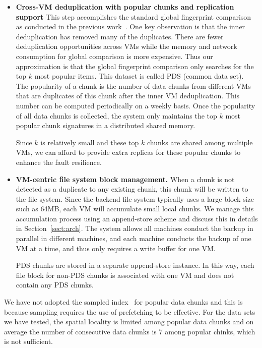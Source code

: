 \begin{itemize}
\item \textbf{Cross-VM deduplication with popular chunks and replication support}
This step accomplishes the standard global fingerprint  comparison as conducted
in the previous work~\cite{??}.
One key observation is that the inner deduplication has removed many of the duplicates.
There are fewer deduplication opportunities across VMs while the memory and network
consumption for global comparison is more expensive.
Thus our approximation is that the global fingerprint comparison only searches for the top $k$
most popular items. This dataset is called PDS (common data set). 
The popularity of a chunk is the number  of data chunks  from different VMs
that are duplicates of this chunk after the inner VM deduplication.
This number can be computed periodically on a weekly basis.
Once the popularity of all data chunks is collected, the system only maintains the top $k$
most popular chunk signatures in a distributed shared memory.  

Since $k$ is relatively small and these top $k$ chunks are shared among multiple VMs, 
we can afford to provide extra replicas for these popular chunks to enhance the fault resilience.

\item \textbf{VM-centric file system block management.}
When a chunk is not detected as a duplicate to any existing chunk, this chunk will be written
to the file system. Since the backend file system typically uses a large block size such as 64MB, each VM will 
accumulate small local chunks. We manage this accumulation process using an append-store  scheme
and discuss this in details in Section~\ref{sect:arch}.
The system allows all machines conduct the backup in parallel in different machines, and each machine
conducts the backup of one VM at a time, and thus only requires a write  buffer for one VM.

PDS chunks are stored in a separate append-store instance. In this way, each
file block for non-PDS chunks is associated with one VM and does not contain
any PDS chunks. 
\end{itemize}

We have not  adopted the  sampled index~\cite{Guo2011} 
for  popular data chunks and  this is because sampling requires the use of prefetching to be effective.
For the data sets we have tested, the spatial locality is limited among popular
data chunks and  on average the number of consecutive data chunks is 7 among popular chinks, which is not sufficient.


